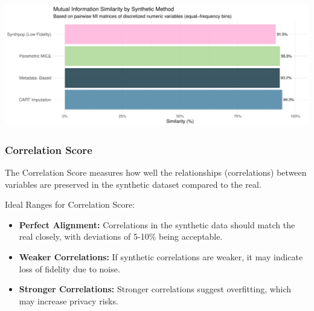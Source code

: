 \documentclass[
  letterpaper,
  DIV=11,
  numbers=noendperiod]{scrartcl}
\providecommand{\tightlist}{%
  \setlength{\itemsep}{0pt}\setlength{\parskip}{0pt}}\usepackage{longtable,booktabs,array}
\begin{document}
\begin{center}
\includegraphics[width=1\linewidth,height=\textheight,keepaspectratio]{heart_failure_synthetic_data_project_files/figure-pdf/mutual-information-score-1.pdf}
\end{center}

\subsubsection{Correlation Score}\label{correlation-score}

The Correlation Score measures how well the relationships (correlations)
between variables are preserved in the synthetic dataset compared to the
real.

Ideal Ranges for Correlation Score:

\begin{itemize}
\tightlist
\item
  \textbf{Perfect Alignment:} Correlations in the synthetic data should
  match the real closely, with deviations of 5-10\% being acceptable.
\item
  \textbf{Weaker Correlations:} If synthetic correlations are weaker, it
  may indicate loss of fidelity due to noise.
\item
  \textbf{Stronger Correlations:} Stronger correlations suggest
  overfitting, which may increase privacy risks.
\end{itemize}
\end{document}
